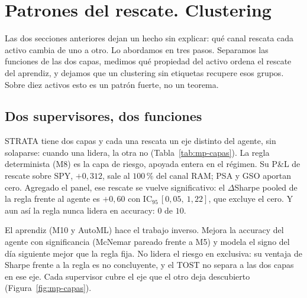 \section{Patrones del rescate. Clustering}
\label{sec:mp-mecanismo}


Las dos secciones anteriores dejan un hecho sin explicar: qué canal rescata cada activo cambia de uno a otro. Lo abordamos en tres pasos. Separamos las funciones de las dos capas, medimos qué propiedad del activo ordena el rescate del aprendiz, y dejamos que un clustering sin etiquetas recupere esos grupos. Sobre diez activos esto es un patrón fuerte, no un teorema.

\subsection{Dos supervisores, dos funciones}
\label{sec:mp-mec-capas}

STRATA tiene dos capas y cada una rescata un eje distinto del agente, sin solaparse: cuando una lidera, la otra no (Tabla~\ref{tab:mp-capas}). La regla determinista (M8) es la capa de riesgo, apoyada entera en el régimen. Su P\&L de rescate sobre SPY, $+0{,}312$, sale al $100\,\%$ del canal RAM; PSA y GSO aportan cero. Agregado el panel, ese rescate se vuelve significativo: el $\Delta$Sharpe pooled de la regla frente al agente es $+0{,}60$ con IC$_{95}\,[0{,}05,\ 1{,}22]$, que excluye el cero. Y aun así la regla nunca lidera en accuracy: $0$ de $10$.

El aprendiz (M10 y AutoML) hace el trabajo inverso. Mejora la accuracy del agente con significancia (McNemar pareado frente a M5) y modela el signo del día siguiente mejor que la regla fija. No lidera el riesgo en exclusiva: su ventaja de Sharpe frente a la regla es no concluyente, y el TOST no separa a las dos capas en ese eje. Cada supervisor cubre el eje que el otro deja descubierto (Figura~\ref{fig:mp-capas}).

